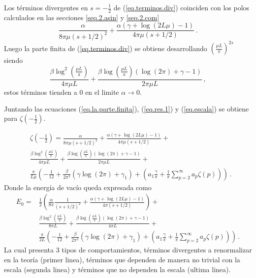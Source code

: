 Los términos divergentes en $s = -\frac{1}{2} $ de (\ref{eq.terminos.div}) coinciden con los polos calculados en las secciones \ref{seq.2.asin} y \ref{seq.2.com}
\begin{equation*}
	\frac{\alpha}{8  \pi \mu (s+1/2)^2} +
    \frac{ \alpha ( \gamma  +  \log (2L \mu ) -1 ) }{4  \pi \mu (s+1/2) }
    	\, .
\end{equation*}
Luego la parte finita de (\ref{eq.terminos.div}) se obtiene desarrollando $\left(\frac{\mu L}{\pi}\right) ^{2s} $ siendo
\begin{equation}\label{eq.la.parte.finita}
\frac{\beta \log ^2 \left( \frac{\mu L}{\pi} \right)}{4 \pi \mu L}  +
\frac{
	\beta \log \left( \frac{\mu L}{\pi}\right) 
	( \log (2 \pi ) + \gamma -1)
	}{2 \pi \mu L}
\, ,
\end{equation}
estos términos tienden a $0$ en el limite $\alpha \rightarrow 0$.

Juntando las ecuaciones (\ref{eq.la.parte.finita}), (\ref{eq.res.1}) y (\ref{eq.escala}) se obtiene para $\zeta \left( - \frac{1}{2} \right)$.

\begin{equation}\label{eq.zeta.final}
\begin{aligned}
&\zeta \left( - \frac{1}{2} \right) =
		\frac{\alpha}{8  \pi \mu (s+1/2)^2} +
	    \frac{
	    	\alpha ( \gamma  +  \log (2L \mu ) -1 ) }
	    	{4  \pi \mu (s+1/2) } 
	      	+ \\[5pt]
		& 
		\frac{\beta \log ^2 \left( \frac{\mu L}{\pi} \right)}{4 \pi \mu L}  +
		\frac{
			\beta \log \left( \frac{\mu L}{\pi}\right)
				( \log (2 \pi ) + \gamma -1)}
			{2 \pi \mu L} + \\[5pt]
			&
\frac{\pi}{L \mu}  
					\left(
							- \frac{1}{12} +
							\frac{\beta}{2 \pi ^2} \left(
														\gamma \log (2 \pi)
														+ \gamma _1
														\right) +
							\left(
								a _1 \frac{\gamma}{\pi} +
								\frac{1}{\pi} \sum _{p=2} ^{\infty}
								a_p \zeta (p) 
								\right)
							\right) 
\, .
\end{aligned}
\end{equation}
Donde la energía de vacío queda expresada como
\begin{align}\label{energia.vacio.final}
\nonumber
E _0 =& \frac{1}{2} \left(
				\frac{\alpha}{8 \pi  } \frac{1}{(s+1/2)^2} + 
				\frac{\alpha ( \gamma  +  \log (2L \mu ) -1 )}{4 \pi  (s+1/2)}
				\right) + \\		
		&\frac{\beta \log ^2 \left( \frac{\mu L}{\pi} \right)}{8 \pi  L}  +
		\frac{
			\beta \log \left( \frac{\mu L}{\pi}\right)
				( \log (2 \pi ) + \gamma -1)}
			{4 \pi  L} + \\				
\nonumber
	&\frac{\pi}{2 L }  
					\left(
							- \frac{1}{12} +
							\frac{\beta}{2 \pi ^2}
														( \gamma \log (2 \pi)
														+ \gamma _1 ) +
																\left(
								a _1 \frac{\gamma}{\pi} +
								\frac{1}{\pi} \sum _{p=2} ^{\infty}
								a_p \zeta (p) 
														\right)	
						\right)
\, .
\end{align}
La cual presenta 3 tipos de comportamientos, términos divergentes a renormalizar en la teoría (primer linea), términos que dependen de manera no trivial con la escala (segunda linea) y términos que no dependen la escala (ultima linea).


